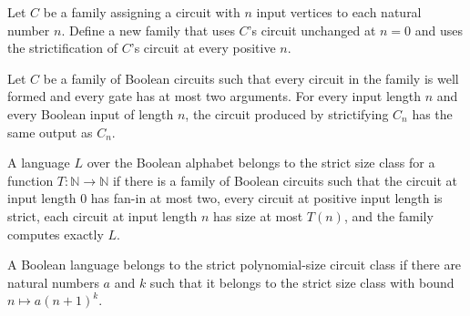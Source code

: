 \begin{definition}
\label{BoolCircuit.DAGCircuitFamily.strictify}
\leanok
{}
Let $C$ be a family assigning a circuit with $n$ input vertices to each natural number
$n$. Define a new family that uses $C$'s circuit unchanged at $n=0$ and uses the
strictification of $C$'s circuit at every positive $n$.
\end{definition}

\begin{theorem}
\label{BoolCircuit.DAGCircuitFamily.strictify_eval}
\leanok
{}
Let $C$ be a family of Boolean circuits such that every circuit in the family is well
formed and every gate has at most two arguments. For every input length $n$ and every
Boolean input of length $n$, the circuit produced by strictifying $C_n$ has the same
output as $C_n$.
\end{theorem}

\begin{definition}
\label{Language.InStrictSIZE}
\leanok
{}
A language $L$ over the Boolean alphabet belongs to the strict size class for a function
$T:\mathbb{N}\to\mathbb{N}$ if there is a family of Boolean circuits such that the
circuit at input length $0$ has fan-in at most two, every circuit at positive input
length is strict, each circuit at input length $n$ has size at most $T(n)$, and the
family computes exactly $L$.
\end{definition}

\begin{definition}
\label{Language.InStrictPPoly}
\leanok
{}
A Boolean language belongs to the strict polynomial-size circuit class if there are
natural numbers $a$ and $k$ such that it belongs to the strict size class with bound
$n\mapsto a(n+1)^k$.
\end{definition}

